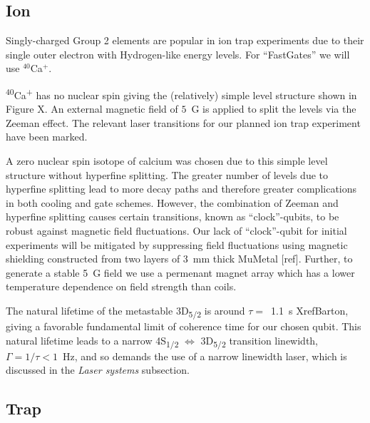 \documentclass[12pt]{iopart}
\begin{document}
\subsection{Ion}
Singly-charged Group 2 elements are popular in ion trap
experiments due to their single outer electron with Hydrogen-like
energy levels. For ``FastGates'' we will use $^{40}$Ca$^+$.

\textsuperscript{40}Ca\textsuperscript{+} has
no nuclear spin giving the
(relatively) simple level structure shown in Figure X. An external
magnetic field of $5$~G is applied to split the levels via the Zeeman
effect. The relevant laser transitions for our planned ion trap
experiment have been marked.

A zero nuclear spin isotope of calcium was chosen due to this simple
level structure without hyperfine splitting. The greater number of
levels due to hyperfine splitting lead to more decay paths and
therefore greater complications in both cooling and gate schemes.
However, the combination of Zeeman and hyperfine splitting causes
certain transitions, known as ``clock''-qubits, to be robust against
magnetic field fluctuations. Our lack of ``clock''-qubit for initial
experiments will be mitigated by suppressing field fluctuations using
magnetic shielding constructed from two layers of 3~mm thick MuMetal
[ref]. Further, to generate a stable 5~G field we use a permenant
magnet array which has a lower temperature dependence on field
strength than coils.


The natural lifetime of the metastable 3D\textsubscript{5/2} is around
$\tau =$~1.1~s XrefBarton, giving a favorable fundamental limit of coherence
time for our chosen qubit.  This natural lifetime leads to a narrow
4S\textsubscript{1/2} $\Leftrightarrow$ 3D\textsubscript{5/2}
transition linewidth, $\Gamma = 1/\tau < 1$~Hz, and so demands the use of a
narrow linewidth laser, which is discussed in the \textit{Laser
  systems} subsection.


\subsection{Trap}
\end{document}
